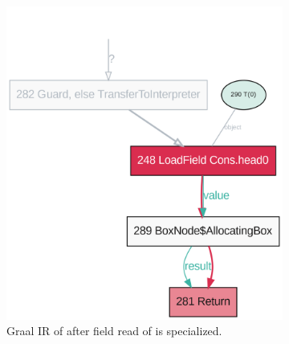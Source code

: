 \begin{figure}
	\centering
	\begin{subfigure}[b]{0.4\textwidth}
		\centering
		\includegraphics[width=\textwidth]{figures/dot/List.head.specialized.TruffleTier.png}
		\caption{Graal IR of  after field read of  is specialized.}
		\label{graalir:cons-head-specialized}
	\end{subfigure}
	\hfill
	\begin{subfigure}[b]{0.4\textwidth}
		\centering

\end{subfigure}
\end{figure}
